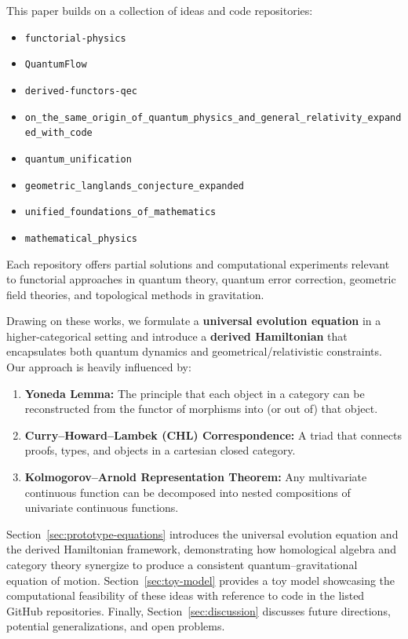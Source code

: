 \documentclass[11pt]{article}
\begin{document}
This paper builds on a collection of ideas and code repositories:
\begin{itemize}
    \item \texttt{functorial-physics}~\cite{functorial-physics}
    \item \texttt{QuantumFlow}~\cite{QuantumFlow}
    \item \texttt{derived-functors-qec}~\cite{derived-functors-qec}
    \item \texttt{on\_the\_same\_origin\_of\_quantum\_physics\_and\_general\_relativity\_expanded\_with\_code}~\cite{on-same-origin}
    \item \texttt{quantum\_unification}~\cite{quantum-unification}
    \item \texttt{geometric\_langlands\_conjecture\_expanded}~\cite{geom-lang}
    \item \texttt{unified\_foundations\_of\_mathematics}~\cite{unified-foundations}
    \item \texttt{mathematical\_physics}~\cite{math-phys}
\end{itemize}
Each repository offers partial solutions and computational experiments relevant to functorial approaches in quantum theory, quantum error correction, geometric field theories, and topological methods in gravitation.

Drawing on these works, we formulate a \textbf{universal evolution equation} in a higher-categorical setting and introduce a \textbf{derived Hamiltonian} that encapsulates both quantum dynamics and geometrical/relativistic constraints. Our approach is heavily influenced by:
\begin{enumerate}
    \item \textbf{Yoneda Lemma:} The principle that each object in a category can be reconstructed from the functor of morphisms into (or out of) that object.
    \item \textbf{Curry--Howard--Lambek (CHL) Correspondence:} A triad that connects proofs, types, and objects in a cartesian closed category. 
    \item \textbf{Kolmogorov--Arnold Representation Theorem:} Any multivariate continuous function can be decomposed into nested compositions of univariate continuous functions.
\end{enumerate}

Section~\ref{sec:prototype-equations} introduces the universal evolution equation and the derived Hamiltonian framework, demonstrating how homological algebra and category theory synergize to produce a consistent quantum–gravitational equation of motion. Section~\ref{sec:toy-model} provides a toy model showcasing the computational feasibility of these ideas with reference to code in the listed GitHub repositories. Finally, Section~\ref{sec:discussion} discusses future directions, potential generalizations, and open problems.
\end{document}
